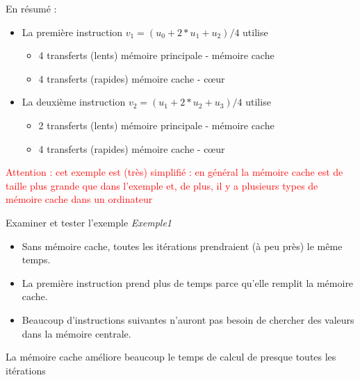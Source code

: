\documentclass{beamer}
\begin{document}
\begin{frame}
	En résumé :
	\begin{itemize}
		\item La première instruction $v_1 = (u_0 + 2*u_1 + u_2)/4$ utilise
		\begin{itemize}
			\item 4 transferts (lents) mémoire principale - mémoire cache
			\item 4 transferts (rapides)  mémoire cache - c\oe ur
		\end{itemize} 
	\smallskip
		\item La deuxième instruction $v_2 = (u_1 + 2*u_2 + u_3)/4$ utilise
		\begin{itemize}
			\item 2 transferts (lents) mémoire principale - mémoire cache
			\item 4 transferts (rapides) mémoire cache - c\oe ur
		\end{itemize}
	\end{itemize}
\vfill
    \textcolor{red}{Attention : cet exemple est (très) simplifié : en général la mémoire cache est de taille plus grande que dans l'exemple et, de plus, il y a plusieurs types de mémoire cache dans un ordinateur}
\end{frame}

\begin{frame}
\vfill
Examiner et tester l'exemple {\it Exemple1} 
\vfill
\begin{itemize}
	\item Sans mémoire cache, toutes les itérations prendraient (à peu près) le même temps.
	\item La première instruction prend plus de temps parce qu'elle remplit la mémoire cache.
	\item Beaucoup d'instructions suivantes n'auront pas besoin de chercher des valeurs dans la mémoire centrale.
\end{itemize}    
    
\vfill
    La mémoire cache améliore beaucoup le temps de calcul de presque toutes les itérations 
    

\end{frame}
\end{document}
